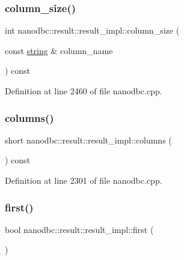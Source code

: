 \subsubsection{\texorpdfstring{column\_size()}{column\_size()}\hspace{0.1cm}{\footnotesize\ttfamily [2/2]}}
{\footnotesize\ttfamily int nanodbc\+::result\+::result\+\_\+impl\+::column\+\_\+size (\begin{DoxyParamCaption}\item[{const \mbox{\hyperlink{namespacenanodbc_abfc0ece56278e590911ec8352774c212}{string}} \&}]{column\+\_\+name }\end{DoxyParamCaption}) const\hspace{0.3cm}{\ttfamily [inline]}}



Definition at line 2460 of file nanodbc.\+cpp.

\mbox{\label{classnanodbc_1_1result_1_1result__impl_a6ff4deef4702cb3c4b0090d1bac0bb54}} 
\subsubsection{\texorpdfstring{columns()}{columns()}}
{\footnotesize\ttfamily short nanodbc\+::result\+::result\+\_\+impl\+::columns (\begin{DoxyParamCaption}{ }\end{DoxyParamCaption}) const\hspace{0.3cm}{\ttfamily [inline]}}



Definition at line 2301 of file nanodbc.\+cpp.

\mbox{\label{classnanodbc_1_1result_1_1result__impl_a4c3dd49217ee555ebeac9e4af6e437dc}} 
\subsubsection{\texorpdfstring{first()}{first()}}
{\footnotesize\ttfamily bool nanodbc\+::result\+::result\+\_\+impl\+::first (\begin{DoxyParamCaption}{ }\end{DoxyParamCaption})\hspace{0.3cm}{\ttfamily [inline]}}



